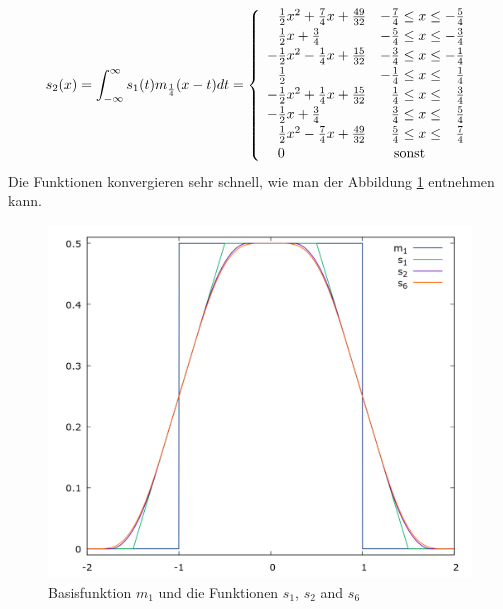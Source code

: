 \documentclass[german]{article}
\begin{document}
\[
s_2(x) = \int_{-\infty}^{\infty} s_1(t)m_\frac{1}{4}(x-t) dt = \left\{
	\begin{array}{ll}
		\hphantom{-}\frac{1}{2}x^2 + \frac{7}{4}x + \frac{49}{32}&           - \frac{7}{4} \le x \le           - \frac{5}{4} \\[2pt]
		\hphantom{-}\frac{1}{2}x   + \frac{3}{4}                 &           - \frac{5}{4} \le x \le           - \frac{3}{4} \\[2pt]
		          - \frac{1}{2}x^2 - \frac{1}{4}x + \frac{15}{32}&           - \frac{3}{4} \le x \le           - \frac{1}{4} \\[2pt]
		\hphantom{-}\frac{1}{2}                                  &           - \frac{1}{4} \le x \le \hphantom{-}\frac{1}{4} \\[2pt]
		          - \frac{1}{2}x^2 + \frac{1}{4}x + \frac{15}{32}& \hphantom{-}\frac{1}{4} \le x \le \hphantom{-}\frac{3}{4} \\[2pt]
		          - \frac{1}{2}x   + \frac{3}{4}                 & \hphantom{-}\frac{3}{4} \le x \le \hphantom{-}\frac{5}{4} \\[2pt]
		\hphantom{-}\frac{1}{2}x^2 - \frac{7}{4}x + \frac{49}{32}& \hphantom{-}\frac{5}{4} \le x \le \hphantom{-}\frac{7}{4} \\[2pt]
		\hphantom{-}0                         & \quad\mbox{sonst} 
	\end {array} 
	\right.
\]
Die Funktionen konvergieren sehr schnell, wie man der Abbildung \ref{fig:sn} entnehmen kann.

\begin{figure}
  \includegraphics[width=\linewidth]{SchnablFunction.png}
  \caption{Basisfunktion $m_1$ und die Funktionen $s_1$, $s_2$ and $s_6$}
  \label{fig:sn}
\end{figure}
\end{document}
